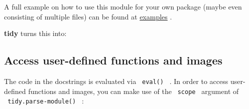 A full example on how to use this module for your own package (maybe
even consisting of multiple files) can be found at
\href{https://github.com/Mc-Zen/tidy/tree/main/examples}{examples} .

\begin{Shaded}
\begin{Highlighting}[]
\NormalTok{///}
\NormalTok{///}
\end{Highlighting}
\end{Shaded}

\textbf{tidy} turns this into:

\subsubsection{\texorpdfstring{\protect\pandocbounded{}}{Tidy example output}}\label{tidy-example-output}

\subsection{Access user-defined functions and
images}\label{access-user-defined-functions-and-images}

The code in the docstrings is evaluated via \texttt{\ eval()\ } . In
order to access user-defined functions and images, you can make use of
the \texttt{\ scope\ } argument of \texttt{\ tidy.parse-module()\ } :

\begin{Shaded}
\begin{Highlighting}[]
\NormalTok{\#\{}
\NormalTok{    )}
\NormalTok{\}}
\end{Highlighting}
\end{Shaded}

